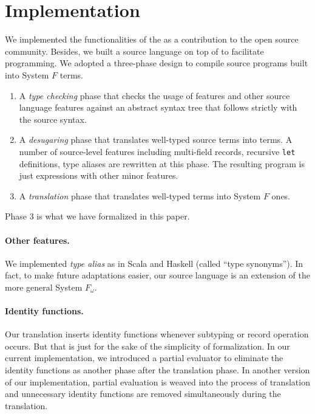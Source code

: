 \section{Implementation}

We implemented the functionalities of the \name as a contribution to the open
source community. Besides, we built a source language on top of \name to
facilitate programming. We adopted a three-phase design to compile source
programs built into System $F$ terms.
\begin{enumerate}
\item A \emph{type checking} phase that checks the usage of \name features and
  other source language features against an abstract syntax tree that follows
  strictly with the source syntax.

\item A \emph{desugaring} phase that translates well-typed source terms into
  \name terms. A number of source-level features including multi-field records,
  recursive \texttt{let} definitions, type aliases are rewritten at this phase.
  The resulting program is just \name expressions with other minor features.

\item A \emph{translation} phase that translates well-typed \name terms into
  System $F$ ones.
\end{enumerate}
Phase 3 is what we have formalized in this paper.

\paragraph{Other features.} We implemented \emph{type alias} as in Scala and
Haskell (called ``type synonyms''). In fact, to make future adaptations easier,
our source language is an extension of the more general System $F_{\omega}$.

\paragraph{Identity functions.} Our translation inserts identity functions
whenever subtyping or record operation occurs. But that is just for the sake of
the simplicity of formalization. In our current implementation, we introduced a
partial evaluator to eliminate the identity functions as another phase after the
translation phase. In another version of our implementation, partial evaluation
is weaved into the process of translation and unnecessary identity functions are
removed simultaneously during the translation.
